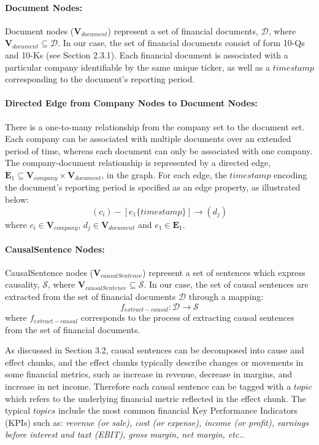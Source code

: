 \documentclass [
     12pt,         %
     a4paper,      %
     BCOR10mm,     %
     DIV14,        %
     liststotoc,   %
     bibtotoc,     %
     idxtotoc,     %
     parskip       %
     ]{scrreprt}
\begin{document}
\paragraph{Document Nodes:} Document nodes ($\mathbf{V}_{document}$) represent a set of financial documents, $\mathbf{\mathcal{D}}$, where $\mathbf{V}_{document} \subseteq \mathbf{\mathcal{D}}$. In our case, the set of financial documents consist of form 10-Qs and 10-Ks (see Section 2.3.1). Each financial document is associated with a particular company identifiable by the same unique ticker, as well as a $timestamp$ corresponding to the document's reporting period.  


\paragraph{Directed Edge from Company Nodes to Document Nodes:} There is a one-to-many relationship from the company set to the document set. Each company can be associated with multiple documents over an extended period of time, whereas each document can only be associated with one company. The company-document relationship is represented by a directed edge, $\mathbf{E}_1 \subseteq \mathbf{V}_{company} \times \mathbf{V}_{document}$, in the graph. For each edge, the $timestamp$ encoding the document's reporting period is specified as an edge property, as illustrated below:
\[( c_i ) - [ e_1 \{timestamp\} ]\rightarrow ( d_j ) \]
where $c_i \in \mathbf{V}_{company}$,  $d_j \in \mathbf{V}_{document}$ and $e_1 \in \mathbf{E}_1$.


\paragraph{CausalSentence Nodes:} CausalSentence nodes ($\mathbf{V}_{causalSentence}$) represent a set of sentences which express causality, $\mathbf{\mathcal{S}}$, where $\mathbf{V}_{causalSentence} \subseteq \mathcal{S}$. In our case, the set of causal sentences are extracted from the set of financial documents $\mathbf{\mathcal{D}}$ through a mapping: 
\[f_{extract-causal}: \mathbf{\mathcal{D}} \rightarrow \mathbf{\mathcal{S}}\] 
where $f_{extract-causal}$ corresponds to the process of extracting causal sentences from the set of financial documents.

As discussed in Section 3.2, causal sentences can be decomposed into cause and effect chunks, and the effect chunks typically describe changes or movements in some financial metrics, such as increase in revenue, decrease in margins, and increase in net income. Therefore each causal sentence can be tagged with a $topic$ which refers to the underlying financial metric reflected in the effect chunk. The typical $topics$ include the most common financial Key Performance Indicators (KPIs) such as: \emph{revenue (or sale), cost (or expense), income (or profit), earnings before interest and taxt (EBIT), gross margin, net margin, etc.}. 
\end{document}
